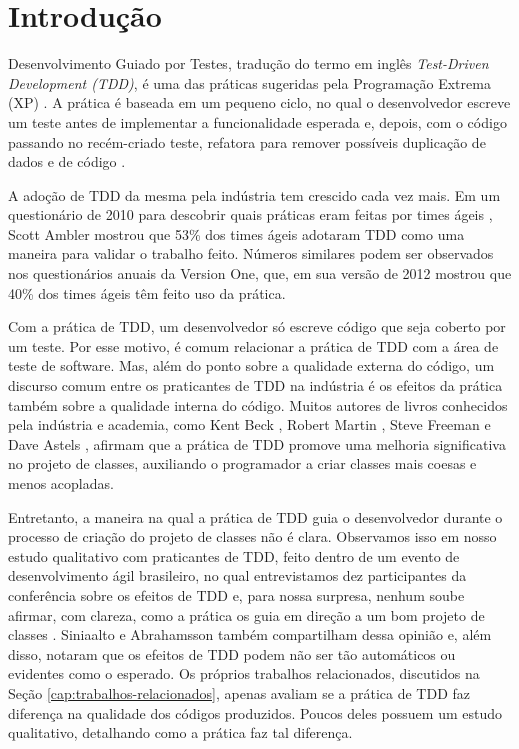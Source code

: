 \chapter{Introdução}
\label{cap:introducao}

Desenvolvimento Guiado por Testes, tradução do termo
em inglês \textit{Test-Driven Development (TDD)},
é uma das práticas sugeridas pela Programação
Extrema (XP) \cite{XPExplained}. A prática é baseada em um pequeno ciclo, 
no qual o desenvolvedor escreve um teste antes
de implementar a funcionalidade esperada e, depois, com o código
passando no recém-criado teste, refatora para 
remover possíveis duplicação de dados e de código \cite{TDDByExample}.

A adoção de TDD da mesma pela indústria tem crescido cada vez mais. 
Em um questionário de 2010 para descobrir quais práticas eram feitas por times
ágeis \cite{wambler-survey-agile}, Scott Ambler mostrou que 53\% dos times ágeis
adotaram TDD como uma maneira para validar o trabalho feito.
Números similares podem ser observados nos questionários anuais da Version One, que,
em sua versão de 2012 \cite{versionone-2012} mostrou que 40\% dos times ágeis têm 
feito uso da prática.

Com a prática de TDD, um desenvolvedor só escreve código
que seja coberto por um teste. Por esse motivo, é comum relacionar a prática
de TDD com a área de teste de software. Mas, além do ponto sobre
a qualidade externa do código, um discurso comum entre os praticantes de TDD
na indústria é os efeitos da prática também sobre a qualidade interna do código.
Muitos autores de livros conhecidos pela indústria e academia, como
Kent Beck \cite{TDDByExample}, Robert Martin \cite{agile-ppp}, 
Steve Freeman \cite{GOOS} e Dave Astels \cite{astels-tdd}, afirmam que a prática de TDD
promove uma melhoria significativa no projeto de classes, auxiliando
o programador a criar classes mais coesas e menos acopladas.

Entretanto, a maneira na qual a prática de TDD guia o desenvolvedor
durante o processo de criação do projeto de classes não é clara. Observamos
isso em nosso estudo qualitativo com praticantes de TDD, feito dentro de um
evento de desenvolvimento ágil brasileiro, no qual entrevistamos dez
participantes da conferência sobre os efeitos de TDD e, para nossa surpresa,
nenhum soube afirmar, com clareza, como a prática os guia em direção
a um bom projeto de classes \cite{aniche-wbma}.
Siniaalto e Abrahamsson \cite{alarming-results} também
compartilham dessa opinião e, além disso, notaram que os efeitos de TDD podem 
não ser tão automáticos ou evidentes como o esperado.
Os próprios trabalhos relacionados, discutidos na Seção \ref{cap:trabalhos-relacionados},
apenas avaliam se a prática de TDD faz diferença na qualidade dos códigos produzidos.
Poucos deles possuem um estudo qualitativo, detalhando como a prática
faz tal diferença.

